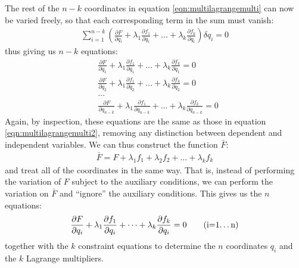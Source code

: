 The rest of the $n-k$ coordinates in equation \ref{eqn:multilagrangemulti} can now be varied freely, so that each corresponding term in the sum must vanish:
\begin{align}
\sum_{i=1}^{n-k}\left(\frac{\partial F}{\partial q_i}+\lambda_1 \frac{\partial f_1}{\partial q_i}+\dots +\lambda_k \frac{\partial f_k}{\partial q_i}\right)\delta q_i=0
\end{align}
thus giving us $n-k$ equations:
\begin{align}
&\frac{\partial F}{\partial q_1}+\lambda_1 \frac{\partial f_1}{\partial q_1}+\dots +\lambda_k \frac{\partial f_k}{\partial q_1}=0\nonumber\\
&\frac{\partial F}{\partial q_2}+\lambda_1 \frac{\partial f_1}{\partial q_2}+\dots +\lambda_k \frac{\partial f_k}{\partial q_2}=0\nonumber\\
&\dots \nonumber\\
&\frac{\partial F}{\partial q_{n-k}}+\lambda_1 \frac{\partial f_1}{\partial q_{n-k}}+\dots +\lambda_k \frac{\partial f_k}{\partial q_{n-k}}=0
\end{align}
Again, by inspection, these equations are the same as those in equation \ref{eqn:multilagrangemulti2}, removing any distinction between dependent and independent variables. We can thus construct the function $\bar{F}$:
\begin{align}
\bar{F}=F+\lambda_1 f_1+\lambda_2 f_2 +\dots +\lambda_k f_k
\end{align}
and treat all of the coordinates in the same way. That is, instead of performing the variation of $F$ subject to the auxiliary conditions, we can perform the variation on $\bar{F}$ and ``ignore'' the auxiliary conditions. This gives us the $n$ equations:
\begin{align}
\frac{\partial F}{\partial q_i}+\lambda_1 \frac{\partial f_1}{\partial q_i}+\dots +\lambda_k \frac{\partial f_k}{\partial q_i}=0 \text{\qquad (i=1\dots n)}
\end{align}
together with the $k$ constraint equations to determine the $n$ coordinates $q_i$ and the $k$ Lagrange multipliers.
